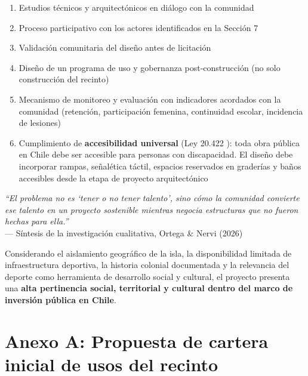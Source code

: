 \documentclass[12pt, a4paper]{article}
\begin{document}
\begin{enumerate}[leftmargin=*, itemsep=4pt]
  \item Estudios técnicos y arquitectónicos en diálogo con la comunidad
  \item Proceso participativo con los actores identificados en la Sección 7
  \item Validación comunitaria del diseño antes de licitación
  \item Diseño de un programa de uso y gobernanza post-construcción (no solo
        construcción del recinto)
  \item Mecanismo de monitoreo y evaluación con indicadores acordados con
        la comunidad (retención, participación femenina, continuidad escolar,
        incidencia de lesiones)
  \item Cumplimiento de \textbf{accesibilidad universal} (Ley 20.422 \citep{Ley20422}):
        toda obra pública en Chile debe ser accesible para personas con discapacidad.
        El diseño debe incorporar rampas, señalética táctil, espacios reservados en
        graderías y baños accesibles desde la etapa de proyecto arquitectónico
\end{enumerate}

\begin{center}
  \textit{``El problema no es `tener o no tener talento', sino cómo la comunidad
  convierte ese talento en un proyecto sostenible mientras negocia estructuras
  que no fueron hechas para ella.''}\\[6pt]
  \small--- Síntesis de la investigación cualitativa, Ortega \& Nervi (2026)
\end{center}

Considerando el aislamiento geográfico de la isla, la disponibilidad limitada de
infraestructura deportiva, la historia colonial documentada y la relevancia del
deporte como herramienta de desarrollo social y cultural, el proyecto presenta una
\textbf{alta pertinencia social, territorial y cultural dentro del marco de inversión
pública en Chile}.

\newpage
\section*{Anexo A: Propuesta de cartera inicial de usos del recinto}
\end{document}
